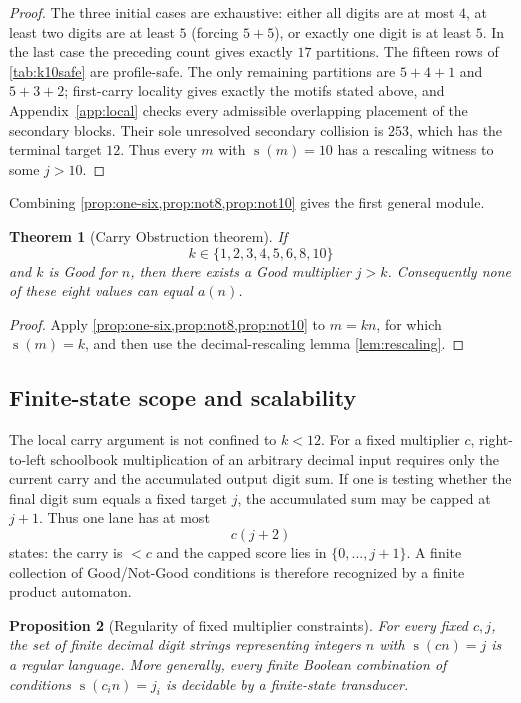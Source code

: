 \documentclass[11pt]{article}
\newtheorem{theorem}{Theorem}[section]
\newtheorem{proposition}[theorem]{Proposition}
\newcommand{\ds}{\operatorname{s}}
\begin{document}
\begin{proof}
The three initial cases are exhaustive: either all digits are at most $4$, at least two digits are at least $5$ (forcing $5+5$), or exactly one digit is at least $5$.  In the last case the preceding count gives exactly $17$ partitions.  The fifteen rows of \cref{tab:k10safe} are profile-safe.  The only remaining partitions are $5+4+1$ and $5+3+2$; first-carry locality gives exactly the motifs stated above, and Appendix~\ref{app:local} checks every admissible overlapping placement of the secondary blocks.  Their sole unresolved secondary collision is $253$, which has the terminal target $12$.  Thus every $m$ with $\ds(m)=10$ has a rescaling witness to some $j>10$.
\end{proof}

Combining \cref{prop:one-six,prop:not8,prop:not10} gives the first general module.

\begin{theorem}[Carry Obstruction theorem]\label{thm:carryobs}
If
\[
 k\in\{1,2,3,4,5,6,8,10\}
\]
and $k$ is Good for $n$, then there exists a Good multiplier $j>k$.  Consequently none of these eight values can equal $a(n)$.
\end{theorem}

\begin{proof}
Apply \cref{prop:one-six,prop:not8,prop:not10} to $m=kn$, for which $\ds(m)=k$, and then use the decimal-rescaling lemma \cref{lem:rescaling}.
\end{proof}

\subsection{Finite-state scope and scalability}
The local carry argument is not confined to $k<12$.  For a fixed multiplier $c$, right-to-left schoolbook multiplication of an arbitrary decimal input requires only the current carry and the accumulated output digit sum.  If one is testing whether the final digit sum equals a fixed target $j$, the accumulated sum may be capped at $j+1$.  Thus one lane has at most
\[
 c(j+2)
\]
states: the carry is $<c$ and the capped score lies in $\{0,\ldots,j+1\}$.  A finite collection of Good/Not-Good conditions is therefore recognized by a finite product automaton.

\begin{proposition}[Regularity of fixed multiplier constraints]\label{prop:regular}
For every fixed $c,j$, the set of finite decimal digit strings representing integers $n$ with $\ds(cn)=j$ is a regular language.  More generally, every finite Boolean combination of conditions $\ds(c_i n)=j_i$ is decidable by a finite-state transducer.
\end{proposition}
\end{document}
